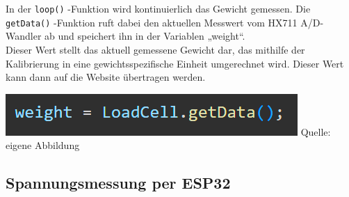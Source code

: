 \documentclass[ngerman,12pt,a4paper]{article}
\begin{document}
		\vspace{8pt}
		In der \texttt{loop()} -Funktion wird kontinuierlich das Gewicht gemessen. Die \texttt{getData()} -Funktion ruft dabei den aktuellen Messwert vom HX711 A/D-Wandler ab und speichert ihn in der Variablen „weight“. \\ [0.3cm]
		Dieser Wert stellt das aktuell gemessene Gewicht dar, das mithilfe der Kalibrierung in eine gewichtsspezifische Einheit umgerechnet wird. Dieser Wert kann dann auf die Website übertragen werden.
		\begin{center}
			\begin{minipage}{1\textwidth}
				\centering
				\includegraphics[width=\textwidth]{Pictures/code_hx711_messung}
				\label{fig:code_hx711_messung}
				\vspace{-3pt}
				{\small Quelle: {eigene Abbildung}}
			\end{minipage}
		\end{center}
		
	 \subsection{Spannungsmessung per ESP32}
\end{document}
